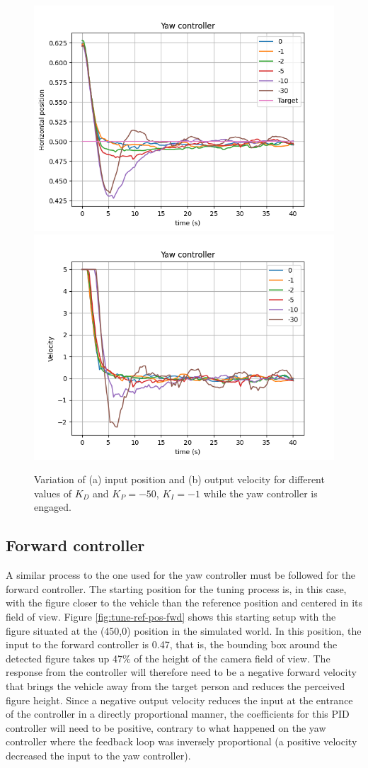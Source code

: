 \begin{figure}
  \centering
  \includegraphics[width=.45\linewidth]{img/pid/yaw/yaw_pos_p50_i1_der.png}
  \includegraphics[width=.45\linewidth]{img/pid/yaw/yaw_vel_p50_i1_der.png}
  \caption{Variation of (a) input position and (b) output velocity for different values of $K_{D}$ and $K_P=-50$, $K_I=-1$ while the yaw controller is engaged.}\label{fig:tune-yaw-der-i1}
\end{figure}



\subsection{Forward controller}

A similar process to the one used for the yaw controller must be followed for the forward controller.
The starting position for the tuning process is, in this case, with the figure closer to the vehicle than the reference position and centered in its field of view.
Figure \ref{fig:tune-ref-pos-fwd} shows this starting setup with the figure situated at the (450,0) position in the simulated world.
In this position, the input to the forward controller is 0.47, that is, the bounding box around the detected figure takes up 47\% of the height of the camera field of view.
The response from the controller will therefore need to be a negative forward velocity that brings the vehicle away from the target person and reduces the perceived figure height.
Since a negative output velocity reduces the input at the entrance of the controller in a directly proportional manner, the coefficients for this PID controller will need to be positive, contrary to what happened on the yaw controller where the feedback loop was inversely proportional (a positive velocity decreased the input to the yaw controller).

